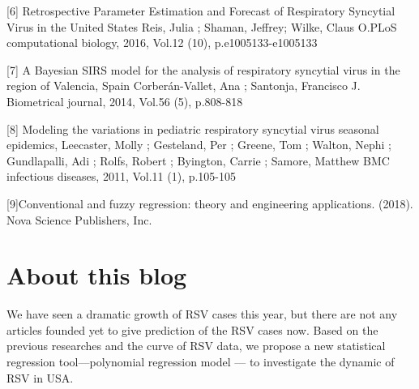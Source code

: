 \documentclass[
  letterpaper,
  DIV=11,
  numbers=noendperiod]{scrreport}
\begin{document}
{[}6{]} Retrospective Parameter Estimation and Forecast of Respiratory
Syncytial Virus in the United States Reis, Julia ; Shaman, Jeffrey;
Wilke, Claus O.PLoS computational biology, 2016, Vol.12 (10),
p.e1005133-e1005133

{[}7{]} A Bayesian SIRS model for the analysis of respiratory syncytial
virus in the region of Valencia, Spain Corberán-Vallet, Ana ; Santonja,
Francisco J. Biometrical journal, 2014, Vol.56 (5), p.808-818

{[}8{]} Modeling the variations in pediatric respiratory syncytial virus
seasonal epidemics, Leecaster, Molly ; Gesteland, Per ; Greene, Tom ;
Walton, Nephi ; Gundlapalli, Adi ; Rolfs, Robert ; Byington, Carrie ;
Samore, Matthew BMC infectious diseases, 2011, Vol.11 (1), p.105-105

{[}9{]}Conventional and fuzzy regression: theory and engineering
applications. (2018). Nova Science Publishers, Inc.


\hypertarget{about-this-blog}{%
\chapter{About this blog}\label{about-this-blog}}

We have seen a dramatic growth of RSV cases this year, but there are not
any articles founded yet to give prediction of the RSV cases now. Based
on the previous researches and the curve of RSV data, we propose a new
statistical regression tool---polynomial regression model --- to
investigate the dynamic of RSV in USA.
\end{document}
